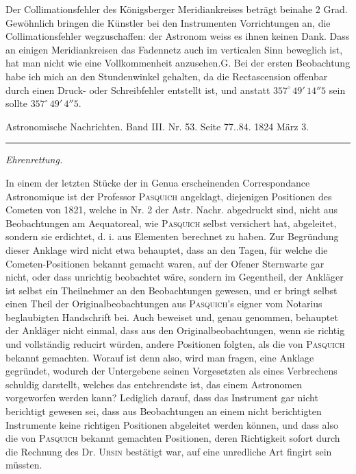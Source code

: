 \clearpage
{}
\hypertarget{native-639-lower}{}
\expandafter\def\csname HistoricalNoteText35\endcsname{Der Collimationsfehler des Königsberger Meridiankreises beträgt beinahe 2 Grad. Gewöhnlich bringen die Künstler bei den Instrumenten Vorrichtungen an, die Collimationsfehler wegzuschaffen: der Astronom weiss es ihnen keinen Dank. Dass an einigen Meridiankreisen das Fadennetz auch im verticalen Sinn beweglich ist, hat man nicht wie eine Vollkommenheit anzusehen.\hfill G.}
\expandafter\def\csname HistoricalNoteText36\endcsname{Bei der ersten Beobachtung habe ich mich an den Stundenwinkel gehalten, da die Rectascension offenbar durch einen Druck- oder Schreibfehler entstellt ist, und anstatt $357^\circ\,49'\,14''5$ sein sollte $357^\circ\,49'\,4''5$.}
\begin{center}\small Astronomische Nachrichten. Band III. Nr. 53. Seite 77..84. 1824 März 3.\\[3pt]\rule{.72\linewidth}{.3pt}\end{center}
\begin{center}\emph{Ehrenrettung.}\end{center}

In einem der letzten Stücke der in Genua erscheinenden Correspondance Astronomique ist der Professor \textsc{Pasquich} angeklagt, diejenigen Positionen des Cometen von 1821, welche in Nr. 2 der Astr. Nachr. abgedruckt sind, nicht aus Beobachtungen am Aequatoreal, wie \textsc{Pasquich} selbst versichert hat, abgeleitet, sondern sie erdichtet, d. i. aus Elementen berechnet zu haben. Zur Begründung dieser Anklage wird nicht etwa behauptet, dass an den Tagen, für welche die Cometen-Positionen bekannt gemacht waren, auf der Ofener Sternwarte gar nicht, oder dass unrichtig beobachtet wäre, sondern im Gegentheil, der Ankläger ist selbst ein Theilnehmer an den Beobachtungen gewesen, und er bringt selbst einen Theil der Originalbeobachtungen aus \textsc{Pasquich}'s eigner vom Notarius beglaubigten Handschrift bei. Auch beweiset und, genau genommen, behauptet der Ankläger nicht einmal, dass aus den Originalbeobachtungen, wenn sie richtig und vollständig reducirt würden, andere Positionen folgten, als die von \textsc{Pasquich} bekannt gemachten. Worauf ist denn also, wird man fragen, eine Anklage gegründet, wodurch der Untergebene seinen Vorgesetzten als eines Verbrechens schuldig darstellt, welches das entehrendste ist, das einem Astronomen vorgeworfen werden kann? Lediglich darauf, dass das Instrument gar nicht berichtigt gewesen sei, dass aus Beobachtungen an einem nicht berichtigten Instrumente keine richtigen Positionen abgeleitet werden können, und dass also die von \textsc{Pasquich} bekannt gemachten Positionen, deren Richtigkeit sofort durch die Rechnung des Dr. \textsc{Ursin} bestätigt war, auf eine unredliche Art fingirt sein müssten.

